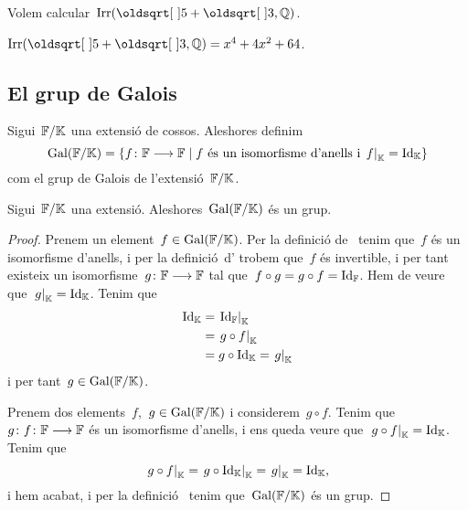 \documentclass[../Apunts.tex]{subfiles}
\begin{document}
	\begin{example}
		Volem calcular~\(\Irr(\sqrt{5}+\sqrt{3},\QQ)\).
	\end{example}
	\begin{solution}
		\(\Irr(\sqrt{5}+\sqrt{3},\QQ)=x^{4}+4x^{2}+64\).
	\end{solution}
\subsection{El grup de Galois}
	\begin{definition}
		\label{def:grup de Galois}
		Sigui~\(\mathbb{F}/\mathbb{K}\) una extensió de cossos. Aleshores definim
		\[\Gal(\FF\extensio\KK)=\{f\colon\FF\longrightarrow\FF\mid f\text{ és un isomorfisme d'anells i }\left.f\right|_{\KK}=\Id_{\KK}\}\]
		com el grup de Galois de l'extensió~\(\mathbb{F}/\mathbb{K}\).
	\end{definition}
	\begin{proposition}
		\label{prop:el grup de Galois és un grup}
		Sigui~\(\mathbb{F}/\mathbb{K}\) una extensió. Aleshores~\(\operatorname{Gal}(\mathbb{F}/\mathbb{K})\) és un grup.
	\end{proposition}
	\begin{proof} %
		Prenem un element~\(f\in\operatorname{Gal}(\mathbb{F}/\mathbb{K})\). Per la definició de~ tenim que~\(f\) és un isomorfisme d'anells, i per la definició~d' trobem que~\(f\) és invertible, i per tant existeix un isomorfisme~\(g\colon\mathbb{F}\longrightarrow\mathbb{F}\) tal que~\(f\circ g=g\circ f=\operatorname{Id}_{\mathbb{F}}\). Hem de veure que~\(\left.g\right|_{\KK}=\Id_{\KK}\). Tenim que
		\begin{align*}
			\Id_{\KK}&=\left.\Id_{\FF}\right|_{\KK} \\
			&=\left.g\circ f\right|_{\KK} \\
			&=g\circ\Id_{\KK}=\left.g\right|_{\KK}
		\end{align*}
		i per tant~\(g\in\operatorname{Gal}(\mathbb{F}/\mathbb{K})\).
		
		Prenem dos elements~\(f\),~\(g\in\operatorname{Gal}(\mathbb{F}/\mathbb{K})\) i considerem~\(g\circ f\). Tenim que~\(g\colon f\colon\mathbb{F}\longrightarrow\mathbb{F}\) és un isomorfisme d'anells, i ens queda veure que~\(\left.g\circ f\right|_{\KK}=\Id_{\KK}\). Tenim que
		\[\left.g\circ f\right|_{\KK}
		=\left.g\circ\Id_{\KK}\right|_{\KK}
		=\left.g\right|_{\KK}
		=\Id_{\KK},\]
		i hem acabat, i per la definició~ tenim que~\(\operatorname{Gal}(\mathbb{F}/\mathbb{K})\) és un grup.
	\end{proof}
\end{document}
